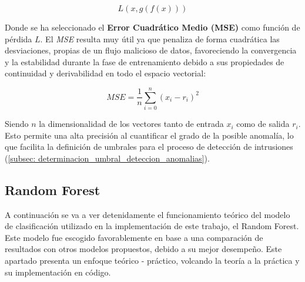 \documentclass[12pt]{article}
\numberwithin{equation}{section} %
\begin{document}
    \begin{equation}
        L(x, g(f(x)))
        \label{eq: loss_function}
    \end{equation}

    \vspace{2.5mm}

    Donde se ha seleccionado el \textbf{Error Cuadrático Medio (MSE)} como función de pérdida $L$. El \textit{MSE} resulta muy útil ya que penaliza de forma cuadrática las desviaciones, propias de un flujo malicioso de datos, favoreciendo la convergencia y la estabilidad durante la fase de entrenamiento debido a sus propiedades de continuidad y derivabilidad en todo el espacio vectorial:    

    \vspace{2.5mm}

    \begin{equation}
        MSE = \frac{1}{n} \sum_{i=0}^{n} \left( x_i - r_i \right)^{2}
        \label{eq: mse}
    \end{equation}

    \vspace{2.5mm}

    Siendo $n$ la dimensionalidad de los vectores tanto de entrada $x_i$ como de salida $r_i$. Esto permite una alta precisión al cuantificar el grado de la posible anomalía, lo que facilita la definición de umbrales para el proceso de detección de intrusiones (\ref{subsec: determinacion_umbral_deteccion_anomalias}).

    \vspace{10mm}





    \subsection{Random Forest}\label{subsec: random_forest}

    \vspace{5mm}

    A continuación se va a ver detenidamente el funcionamiento teórico del modelo de clasificación utilizado en la implementación de este trabajo, el Random Forest. Este modelo fue escogido favorablemente en base a una comparación de resultados con otros modelos propuestos, debido a su mejor desempeño. Este apartado presenta un enfoque teórico - práctico, volcando la teoría a la práctica y su implementación en código.

    \vspace{5mm}
\end{document}
